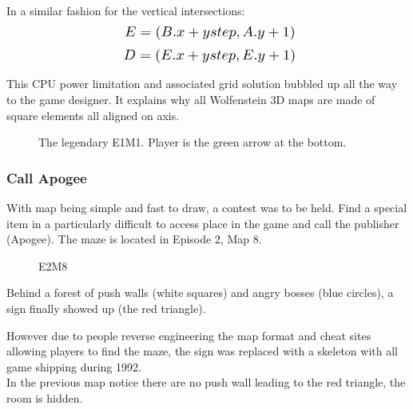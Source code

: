 In a similar fashion for the vertical intersections:\\
  \begin{equation*}
    \scalebox{1.3}{

$E = (B.x + ystep, A.y + 1)$\\
}
\end{equation*}
  \begin{equation*}
    \scalebox{1.3}{
$D = (E.x + ystep, E.y + 1)$\\
}
\end{equation*}

This CPU power limitation and associated grid solution bubbled up all the way to the game designer. It explains why all Wolfenstein 3D maps are made of square elements all aligned on axis.\\
\par
\begin{figure}[H]
  \centering
 \caption{The legendary E1M1. Player is the green arrow at the bottom.}
\end{figure}


\subsubsection{Call Apogee}
With map being simple and fast to draw, a contest was to be held. Find a special item in a particularly difficult to access place in the game and call the publisher (Apogee). The maze is located in Episode 2, Map 8.\\
\par
\begin{figure}[H]
  \centering
 \caption{E2M8}
\end{figure}

\par

\begin{minipage}{.5\textwidth}
Behind a forest of push walls (white squares) and angry bosses (blue circles), a sign finally showed up (the red triangle). \\
\par 
However due to people reverse engineering the map format and cheat sites allowing players to find the maze, the sign was replaced with a skeleton with all game shipping during 1992.\\ In the previous map notice there are no push wall leading to the red triangle, the room is hidden.\\
 \end{minipage}
\begin{minipage}{.5\textwidth}
\begin{figure}[H]
 \centering
\end{figure}
\end{minipage}

